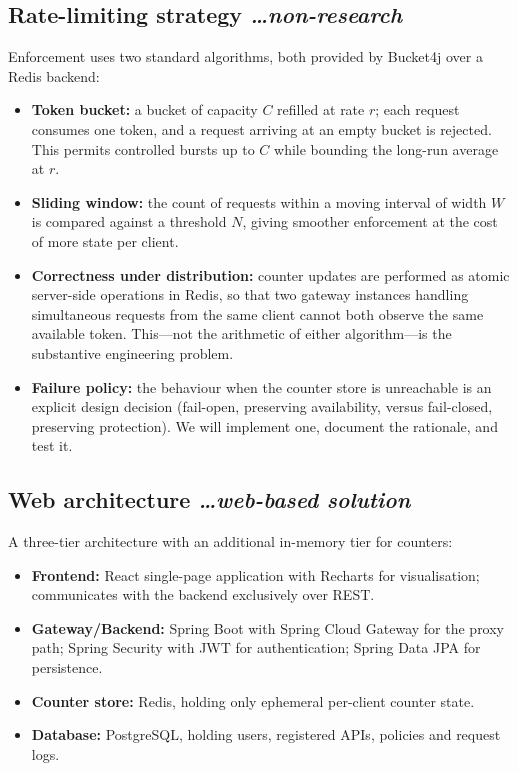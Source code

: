 \documentclass[11pt,a4paper]{article}
\newcommand{\BvrHint}[1]{%
  {\normalfont\normalsize\itshape\hfill #1}}
\begin{document}
\subsection{Rate-limiting strategy %
\BvrHint{\ldots non-research}}
Enforcement uses two standard algorithms, both provided by Bucket4j over a
Redis backend:
\begin{itemize}[leftmargin=0.7cm]
    \item \textbf{Token bucket:} a bucket of capacity $C$ refilled at rate $r$;
      each request consumes one token, and a request arriving at an empty
      bucket is rejected. This permits controlled bursts up to $C$ while
      bounding the long-run average at $r$.
    \item \textbf{Sliding window:} the count of requests within a moving
      interval of width $W$ is compared against a threshold $N$, giving
      smoother enforcement at the cost of more state per client.
    \item \textbf{Correctness under distribution:} counter updates are
      performed as atomic server-side operations in Redis, so that two gateway
      instances handling simultaneous requests from the same client cannot
      both observe the same available token. This---not the arithmetic of
      either algorithm---is the substantive engineering problem.
    \item \textbf{Failure policy:} the behaviour when the counter store is
      unreachable is an explicit design decision (fail-open, preserving
      availability, versus fail-closed, preserving protection). We will
      implement one, document the rationale, and test it.
\end{itemize}

\subsection{Web architecture %
\BvrHint{\ldots web-based solution}}
A three-tier architecture with an additional in-memory tier for counters:
\begin{itemize}[leftmargin=0.7cm]
    \item \textbf{Frontend:} React single-page application with Recharts for
      visualisation; communicates with the backend exclusively over REST.
    \item \textbf{Gateway/Backend:} Spring Boot with Spring Cloud Gateway for
      the proxy path; Spring Security with JWT for authentication; Spring Data
      JPA for persistence.
    \item \textbf{Counter store:} Redis, holding only ephemeral per-client
      counter state.
    \item \textbf{Database:} PostgreSQL, holding users, registered APIs,
      policies and request logs.
\end{itemize}
\end{document}
